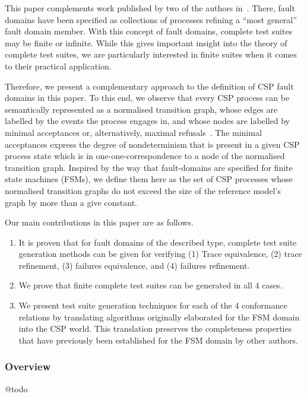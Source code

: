 This paper complements work published by two of the authors 
in~\cite{DBLP:conf/pts/CavalcantiS17}. There, fault domains have been specified 
as collections of processes refining a  ``most general'' fault domain member. With this concept of fault domains, complete test suites may be finite or infinite. While this gives 
important insight into the theory of complete test suites, we are particularly interested
in finite suites when it comes to their practical application.

Therefore, we present a complementary approach to the definition of CSP fault
domains in this paper. To this end, we observe that 
every CSP process can be semantically represented as a 
normalised transition graph, whose edges are labelled by the events the process engages 
in, and whose nodes are labelled by minimal acceptances or, alternatively, 
maximal refusals~\cite{Roscoe:1994:CME:197600}. 
The minimal acceptances express the degree of nondeterminism
that is present in a given CSP process state which is in one-one-correspondence to
a node of the normalised transition graph. 
Inspired by the way that fault-domains are specified for finite state machines (FSMs), 
we define 
them here as the set of CSP processes whose normalised transition graphs do not exceed the
size of the reference model's graph by more than a give constant. 

Our main contributions in this paper are as follows.
\begin{enumerate}
\item It is proven that for fault domains of the described type, complete test suite 
generation methods can be given for verifying (1) Trace equivalence, (2) trace refinement,
(3) failures equivalence, and (4) failures refinement.

\item We prove that finite complete  test suites can be generated in all 4 cases.

\item We present test suite generation techniques for each of the 4 conformance relations
by translating algorithms originally elaborated for the FSM domain into the CSP world. This 
translation preserves the completeness properties that have previously been established
for the FSM domain
by other authors. 
\end{enumerate}



\subsubsection*{Overview}

@todo




